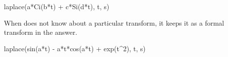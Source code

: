 {{{{{{{{{{{{{\begin{xtc}
\begin{xtccomment}
\end{xtccomment}
\begin{spadsrc}
laplace(a*Ci(b*t) + c*Si(d*t), t, s)
\end{spadsrc}
\begin{TeXOutput}
\begin{fricasmath}{7}
%
\end{fricasmath}
\end{TeXOutput}
\end{xtc}
\begin{xtc}
\begin{xtccomment}
When \Language{} does not know about a particular transform,
it keeps it as a formal transform in the answer.
\end{xtccomment}
\begin{spadsrc}
laplace(sin(a*t) - a*t*cos(a*t) + exp(t^2), t, s)
\end{spadsrc}
\begin{TeXOutput}
\begin{fricasmath}{8}
%
\end{fricasmath}
\end{TeXOutput}
\end{xtc}

}}}}}}}}}}}}}
